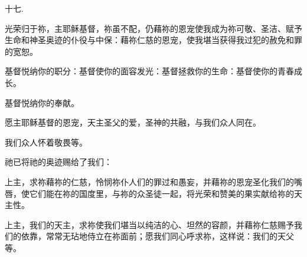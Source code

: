 十七. \par

光荣归于祢，主耶稣基督，祢虽不配，仍藉祢的恩宠使我成为祢可敬、圣洁、赋予生命和神圣奥迹的仆役与中保：藉祢仁慈的恩宠，使我堪当获得我过犯的赦免和罪的宽恕。\par

\par

\par

基督悦纳你的职分：基督使你的面容发光：基督拯救你的生命：基督使你的青春成长。\par

\par

基督悦纳你的奉献。\par

\par

愿主耶稣基督的恩宠，天主圣父的爱，圣神的共融，与我们众人同在。\par

\par

\par

我们众人怀着敬畏等。\par

\par

祂已将祂的奥迹赐给了我们：\par

\par

上主，求祢藉祢的仁慈，怜悯祢仆人们的罪过和愚妄，并藉祢的恩宠圣化我们的嘴唇，使它们能在祢的国度里，与祢的众圣徒一起，将光荣和赞美的果实献给祢的天主性。\par

\par

上主，我们的天主，求祢使我们堪当以纯洁的心、坦然的容颜，并藉祢仁慈赐予我们的依靠，常常无玷地侍立在祢面前；愿我们同心呼求祢，这样说：我们的天父等。\par

